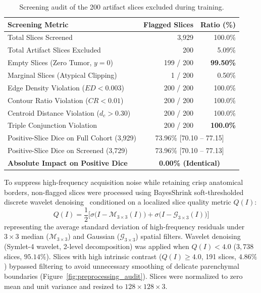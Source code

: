 \documentclass[preprint,3p,times,onecolumn]{elsarticle}
\begin{document}
\begin{table}[tbp]
\centering
\caption{Screening audit of the 200 artifact slices excluded during training.}
\label{tab:screening_audit}
\setlength{\tabcolsep}{8pt}
\small
\begin{tabular*}{\textwidth}{@{\extracolsep{\fill}}lrr}
\toprule
\textbf{Screening Metric} & \textbf{Flagged Slices} & \textbf{Ratio (\%)} \\
\midrule
Total Slices Screened & 3,929 & 100.0\% \\
Total Artifact Slices Excluded & 200 & 5.09\% \\
\midrule
\hspace{1.2em}Empty Slices (Zero Tumor, $y=0$) & 199 / 200 & \textbf{99.50\%} \\
\hspace{1.2em}Marginal Slices (Atypical Clipping) & 1 / 200 & 0.50\% \\
\hspace{1.2em}Edge Density Violation ($ED < 0.003$) & 200 / 200 & 100.0\% \\
\hspace{1.2em}Contour Ratio Violation ($CR < 0.01$) & 200 / 200 & 100.0\% \\
\hspace{1.2em}Centroid Distance Violation ($d_c > 0.30$) & 200 / 200 & 100.0\% \\
\hspace{1.2em}Triple Conjunction Violation & 200 / 200 & \textbf{100.0\%} \\
\midrule
Positive-Slice Dice on Full Cohort (3,929) & \multicolumn{2}{c}{73.96\% [70.10 -- 77.15]} \\
Positive-Slice Dice on Screened (3,729) & \multicolumn{2}{c}{73.96\% [70.10 -- 77.13]} \\
\textbf{Absolute Impact on Positive Dice} & \multicolumn{2}{c}{\textbf{0.00\% (Identical)}} \\
\bottomrule
\end{tabular*}
\end{table}

To suppress high-frequency acquisition noise while retaining crisp anatomical borders, non-flagged slices were processed using BayesShrink soft-thresholded discrete wavelet denoising~\cite{chang2000adaptive} conditioned on a localized slice quality metric $Q(I)$:
\begin{equation}
Q(I) = \frac{1}{2}\Big[\sigma\big(I - \mathcal{M}_{3\times 3}(I)\big) + \sigma\big(I - \mathcal{G}_{3\times 3}(I)\big)\Big]
\end{equation}
representing the average standard deviation of high-frequency residuals under $3 \times 3$ median ($\mathcal{M}_{3\times 3}$) and Gaussian ($\mathcal{G}_{3\times 3}$) spatial filters. Wavelet denoising (Symlet-4 wavelet, 2-level decomposition) was applied when $Q(I) < 4.0$ ($3,738$ slices, $95.14\%$). Slices with high intrinsic contrast ($Q(I) \ge 4.0$, 191 slices, $4.86\%$) bypassed filtering to avoid unnecessary smoothing of delicate parenchymal boundaries (Figure~\ref{fig:preprocessing_audit}). Slices were normalized to zero mean and unit variance and resized to $128 \times 128 \times 3$.
\end{document}

